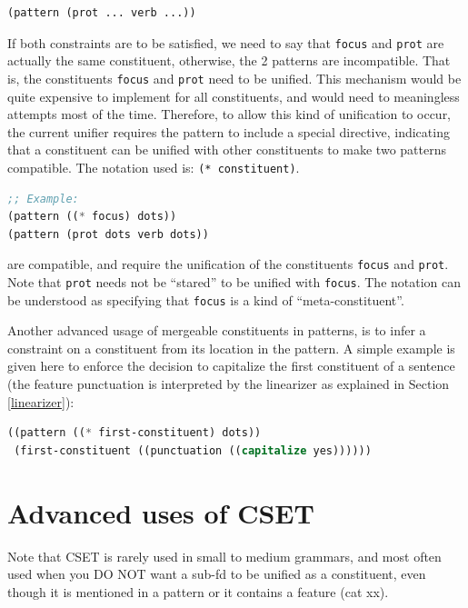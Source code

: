 \documentclass[10pt,a4paper]{report}
\begin{document}
\begin{appendices}
\begin{lstlisting}
(pattern (prot ... verb ...))
\end{lstlisting}

If both constraints are to be satisfied, we need to say that
{\tt focus} and {\tt prot} are actually the same constituent,
otherwise, the 2 patterns are incompatible. That is, the
constituents {\tt focus} and {\tt prot} need to be unified.  This
mechanism would be quite expensive to implement for all
constituents, and would need to meaningless attempts most of the
time.  Therefore, to allow this kind of unification to occur, the
current unifier requires the pattern to include a special
directive, indicating that a constituent can be unified with
other constituents to make two patterns compatible. The notation
used is: {\tt (* constituent)}.

\begin{lstlisting}[language=Lisp]
;; Example:
(pattern ((* focus) dots))
(pattern (prot dots verb dots))
\end{lstlisting}

are compatible, and require the unification of the constituents
{\tt focus} and {\tt prot}.  Note that {\tt prot} needs not be ``stared'' to
be unified with {\tt focus}. The notation can be understood as
specifying that {\tt focus} is a kind of ``meta-constituent''.

Another advanced usage of mergeable constituents in patterns, is to infer a
constraint on a constituent from its location in the pattern.  A simple
example is given here to enforce the decision to capitalize the first
constituent of a sentence (the feature punctuation is interpreted by the
linearizer as explained in Section \ref{linearizer}): 

\begin{lstlisting}[language=Lisp]
((pattern ((* first-constituent) dots))
 (first-constituent ((punctuation ((capitalize yes))))))
\end{lstlisting}



\section{Advanced uses of CSET}

Note that CSET is rarely used in small to medium grammars, and most often
used when you DO NOT want a sub-fd to be unified as a constituent, even
though it is mentioned in a pattern or it contains a feature (cat xx).


\end{appendices}
\end{document}
